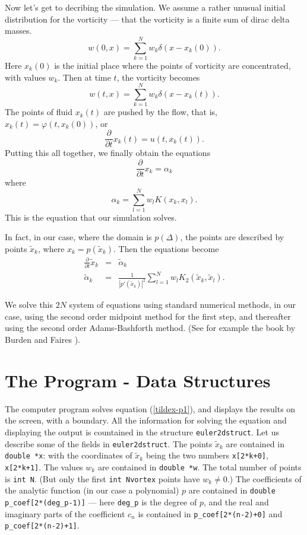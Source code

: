 \documentclass[12pt]{article}
\begin{document}
Now let's get to decribing the simulation.  We assume a rather
unusual initial distribution for the vorticity --- that the
vorticity is a finite sum of dirac delta masses.
\[ w(0,x) = \sum_{k=1}^N w_k \delta(x-x_k(0)) .\]
Here $x_k(0)$ is the initial place where the points
of vorticity are concentrated, with values $w_k$.
Then at time $t$, the vorticity becomes
\[ w(t,x) = \sum_{k=1}^N w_k \delta(x-x_k(t)) .\]
The points of fluid $x_k(t)$ are pushed by the
flow, that is, $x_k(t) = \varphi(t,x_k(0))$, or
\[ \frac{\partial}{\partial t} x_k(t) = u(t,x_k(t)) .\]
Putting this all together, we finally obtain the equations
\[ \frac{\partial}{\partial t} x_k = \alpha_k \]
where
\[ \alpha_k   = \sum_{l=1}^N w_l K(x_k,x_l) .\]
This is the equation that our simulation solves.

In fact, in our case, where the domain is $p(\Delta)$,
the points are described by points
$\tilde x_k$, where $x_k = p(\tilde x_k)$.  Then
the equations become
\begin{eqnarray}
\label{tildex-p1}
\frac{\partial}{\partial t} \tilde x_k &=& \tilde\alpha_k \\
\label{tildex-p2}
\tilde\alpha_k &=& \frac1{|p'(\tilde x_k)|^2}
     \sum_{l=1}^N w_l K_2(\tilde x_k,\tilde x_l) .
\end{eqnarray}

We solve this $2N$ system of equations using standard
numerical methods, in our case, using the second order midpoint method
for the first step, and thereafter using the second order Adams-Bashforth
method.  (See for example the book
by Burden and Faires \cite{BF}).

\section{The Program - Data Structures}

The computer program solves equation (\ref{tildex-p1}), and displays
the results on the screen, with a boundary.  All the information
for solving the equation and displaying the output is countained
in the structure {\tt euler2dstruct}.  Let us describe some of
the fields in {\tt euler2dstruct}.
The points $\tilde x_k$ are contained
in {\tt double *x}: with the coordinates of
$\tilde x_k$ being the two numbers
{\tt x[2*k+0]}, {\tt x[2*k+1]}.  The values $w_k$ are contained
in {\tt double *w}.  The total number of points is
{\tt int N}.  (But only the first {\tt int Nvortex} points
have $w_k \ne 0$.)  The coefficients of the analytic function
(in our case a polynomial) $p$
are contained in {\tt double p\_coef[2*(deg\_p-1)]} --- here
{\tt deg\_p} is the degree of $p$, and the real and imaginary
parts of the coefficient
$c_n$ is contained in {\tt p\_coef[2*(n-2)+0]} and {\tt p\_coef[2*(n-2)+1]}.
\end{document}
